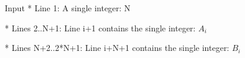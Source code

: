 Input
* Line 1: A single integer: N  

   * Lines 2..N+1: Line i+1 contains the single integer: $A_{i}$

   * Lines N+2..2*N+1: Line i+N+1 contains the single integer: $B_{i}$